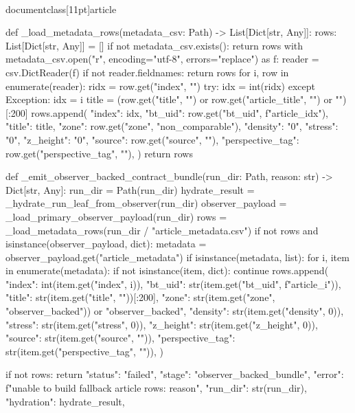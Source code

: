 \\documentclass[11pt]{article}
\begin{document}
\begin{CodeBlock}
def _load_metadata_rows(metadata_csv: Path) -> List[Dict[str, Any]]:
    rows: List[Dict[str, Any]] = []
    if not metadata_csv.exists():
        return rows
    with metadata_csv.open("r", encoding="utf-8", errors="replace") as f:
        reader = csv.DictReader(f)
        if not reader.fieldnames:
            return rows
        for i, row in enumerate(reader):
            ridx = row.get("index", "")
            try:
                idx = int(ridx)
            except Exception:
                idx = i
            title = (row.get("title", "") or row.get("article_title", "") or "")[:200]
            rows.append(
                {
                    "index": idx,
                    "bt_uid": row.get("bt_uid", f"article_{idx}"),
                    "title": title,
                    "zone": row.get("zone", "non_comparable"),
                    "density": "0",
                    "stress": "0",
                    "z_height": "0",
                    "source": row.get("source", ""),
                    "perspective_tag": row.get("perspective_tag", ""),
                }
            )
    return rows


def _emit_observer_backed_contract_bundle(run_dir: Path, reason: str) -> Dict[str, Any]:
    run_dir = Path(run_dir)
    hydrate_result = _hydrate_run_leaf_from_observer(run_dir)
    observer_payload = _load_primary_observer_payload(run_dir)
    rows = _load_metadata_rows(run_dir / "article_metadata.csv")
    if not rows and isinstance(observer_payload, dict):
        metadata = observer_payload.get("article_metadata")
        if isinstance(metadata, list):
            for i, item in enumerate(metadata):
                if not isinstance(item, dict):
                    continue
                rows.append(
                    {
                        "index": int(item.get("index", i)),
                        "bt_uid": str(item.get("bt_uid", f"article_{i}")),
                        "title": str(item.get("title", ""))[:200],
                        "zone": str(item.get("zone", "observer_backed")) or "observer_backed",
                        "density": str(item.get("density", 0)),
                        "stress": str(item.get("stress", 0)),
                        "z_height": str(item.get("z_height", 0)),
                        "source": str(item.get("source", "")),
                        "perspective_tag": str(item.get("perspective_tag", "")),
                    }
                )

    if not rows:
        return {
            "status": "failed",
            "stage": "observer_backed_bundle",
            "error": f"unable to build fallback article rows: {reason}",
            "run_dir": str(run_dir),
            "hydration": hydrate_result,
        }


\end{CodeBlock}
\end{document}
